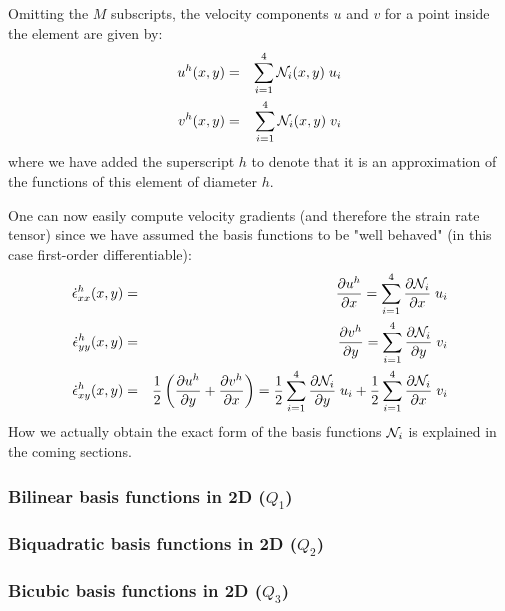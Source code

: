 Omitting the $M$ subscripts, the velocity components $u$ and $v$ for a point inside the element
 are given by:
\begin{eqnarray}
u^h(x,y) &=& \sum_{i=1}^4 {\mathcal{N}}_i(x,y)\;  u_i \\
v^h(x,y) &=& \sum_{i=1}^4 {\mathcal{N}}_i(x,y)\;  v_i \label{bf01}
\end{eqnarray}
where we have added the superscript $h$ to denote that it is an approximation of the functions 
of this element of diameter $h$. 

One can now easily compute velocity gradients (and therefore the 
strain rate tensor) since we have assumed the basis functions to be "well behaved" 
(in this case first-order differentiable):
\begin{eqnarray}
\dot{\epsilon}^h_{xx}(x,y) 
&=& \frac{\partial u^h}{\partial x} = \sum_{i=1}^4 \frac{\partial {\mathcal{N}}_i}{\partial x}\;  u_i \\
\dot{\epsilon}^h_{yy}(x,y) 
&=& \frac{\partial v^h}{\partial y} = \sum_{i=1}^4 \frac{\partial {\mathcal{N}}_i}{\partial y}\;  v_i \\
\dot{\epsilon}^h_{xy}(x,y) 
&=& \frac{1}{2}\left(\frac{\partial u^h}{\partial y} + \frac{\partial v^h}{\partial x} \right) 
= \frac{1}{2}\sum_{i=1}^4 \frac{\partial {\mathcal{N}}_i}{\partial y}\;  u_i
+ \frac{1}{2}\sum_{i=1}^4 \frac{\partial {\mathcal{N}}_i}{\partial x}\;  v_i
\end{eqnarray}
How we actually obtain the exact form of the basis functions ${\mathcal{N}}_i$ is explained in the coming sections.



\subsubsection{Bilinear basis functions in 2D ($Q_1$)} \label{ss:q12d}



\subsubsection{Biquadratic basis functions in 2D ($Q_2$)}\label{ss:q22d}



\subsubsection{Bicubic basis functions in 2D ($Q_3$)}

